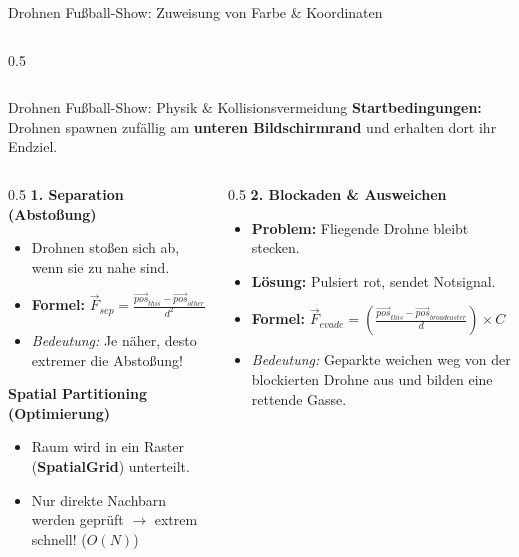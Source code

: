 \documentclass[aspectratio=169]{beamer}
\begin{document}
\begin{frame}{Drohnen Fußball-Show: Zuweisung von Farbe \& Koordinaten}
\begin{columns}[c]
\begin{column}{0.5\textwidth}
\begin{center}
\end{center}
\end{column}
\end{columns}
\end{frame}

\begin{frame}{Drohnen Fußball-Show: Physik \& Kollisionsvermeidung}
\footnotesize
\textbf{Startbedingungen:} Drohnen spawnen zufällig am \textbf{unteren Bildschirmrand} und erhalten dort ihr Endziel.

\vspace{0.1cm}
\begin{columns}[T]
\begin{column}{0.5\textwidth}
\textbf{1. Separation (Abstoßung)}
\begin{itemize}\setlength{\itemsep}{0pt}\setlength{\parskip}{0pt}
    \item Drohnen stoßen sich ab, wenn sie zu nahe sind.
    \item \textbf{Formel:} $\vec{F}_{sep} = \frac{\vec{pos}_{this} - \vec{pos}_{other}}{d^2}$
    \item \textit{Bedeutung:} Je näher, desto extremer die Abstoßung!
\end{itemize}
\textbf{Spatial Partitioning (Optimierung)}
\begin{itemize}\setlength{\itemsep}{0pt}\setlength{\parskip}{0pt}
    \item Raum wird in ein Raster (\textbf{SpatialGrid}) unterteilt.
    \item Nur direkte Nachbarn werden geprüft $\rightarrow$ extrem schnell! ($O(N)$)
\end{itemize}
\end{column}

\begin{column}{0.5\textwidth}
\textbf{2. Blockaden \& Ausweichen}
\begin{itemize}\setlength{\itemsep}{0pt}\setlength{\parskip}{0pt}
    \item \textbf{Problem:} Fliegende Drohne bleibt stecken.
    \item \textbf{Lösung:} Pulsiert rot, sendet Notsignal.
    \item \textbf{Formel:} $\vec{F}_{evade} = \left(\frac{\vec{pos}_{this} - \vec{pos}_{broadcaster}}{d}\right) \times C$
    \item \textit{Bedeutung:} Geparkte weichen weg von der blockierten Drohne aus und bilden eine rettende Gasse.
\end{itemize}
\end{column}
\end{columns}


\end{frame}
\end{document}
